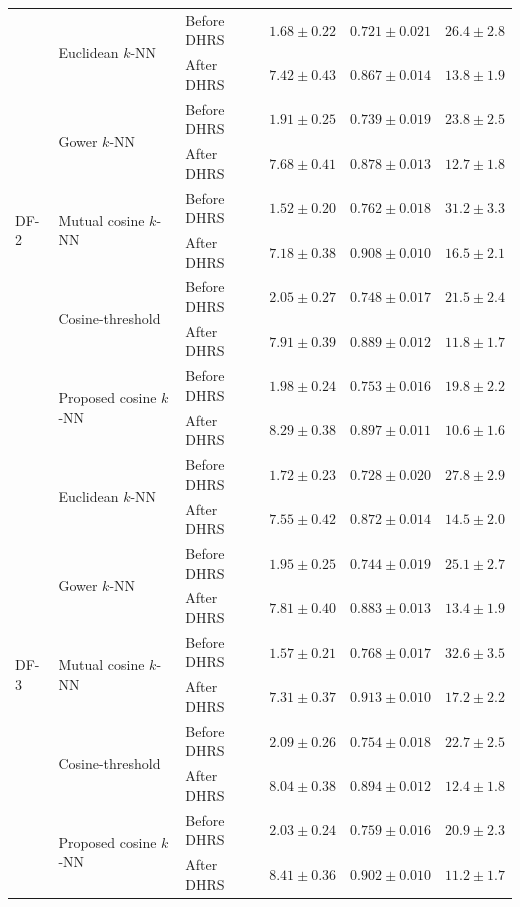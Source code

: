 \documentclass[pdflatex,sn-mathphys-num]{sn-jnl}%
\theoremstyle{thmstyleone}%
\theoremstyle{thmstyletwo}%
\theoremstyle{thmstylethree}%
\begin{document}
\begin{table}[!ht]
{\begin{tabular}{@{}lllccc@{}}
\multirow{10}{*}{DF-2}
& \multirow{2}{*}{Euclidean \(k\)-NN}
& Before DHRS & $1.68\pm0.22$ & $0.721\pm0.021$ & $26.4\pm2.8$ \\
&& After DHRS & $7.42\pm0.43$ & $0.867\pm0.014$ & $13.8\pm1.9$ \\
& \multirow{2}{*}{Gower \(k\)-NN}
& Before DHRS & $1.91\pm0.25$ & $0.739\pm0.019$ & $23.8\pm2.5$ \\
&& After DHRS & $7.68\pm0.41$ & $0.878\pm0.013$ & $12.7\pm1.8$ \\
& \multirow{2}{*}{Mutual cosine \(k\)-NN}
& Before DHRS & $1.52\pm0.20$ & $0.762\pm0.018$ & $31.2\pm3.3$ \\
&& After DHRS & $7.18\pm0.38$ & $0.908\pm0.010$ & $16.5\pm2.1$ \\
& \multirow{2}{*}{Cosine-threshold}
& Before DHRS & $2.05\pm0.27$ & $0.748\pm0.017$ & $21.5\pm2.4$ \\
&& After DHRS & $7.91\pm0.39$ & $0.889\pm0.012$ & $11.8\pm1.7$ \\
& \multirow{2}{*}{Proposed cosine \(k\)-NN}
& Before DHRS & $1.98\pm0.24$ & $0.753\pm0.016$ & $19.8\pm2.2$ \\
&& After DHRS & $8.29\pm0.38$ & $0.897\pm0.011$ & $10.6\pm1.6$ \\
\midrule

\multirow{10}{*}{DF-3}
& \multirow{2}{*}{Euclidean \(k\)-NN}
& Before DHRS & $1.72\pm0.23$ & $0.728\pm0.020$ & $27.8\pm2.9$ \\
&& After DHRS & $7.55\pm0.42$ & $0.872\pm0.014$ & $14.5\pm2.0$ \\
& \multirow{2}{*}{Gower \(k\)-NN}
& Before DHRS & $1.95\pm0.25$ & $0.744\pm0.019$ & $25.1\pm2.7$ \\
&& After DHRS & $7.81\pm0.40$ & $0.883\pm0.013$ & $13.4\pm1.9$ \\
& \multirow{2}{*}{Mutual cosine \(k\)-NN}
& Before DHRS & $1.57\pm0.21$ & $0.768\pm0.017$ & $32.6\pm3.5$ \\
&& After DHRS & $7.31\pm0.37$ & $0.913\pm0.010$ & $17.2\pm2.2$ \\
& \multirow{2}{*}{Cosine-threshold}
& Before DHRS & $2.09\pm0.26$ & $0.754\pm0.018$ & $22.7\pm2.5$ \\
&& After DHRS & $8.04\pm0.38$ & $0.894\pm0.012$ & $12.4\pm1.8$ \\
& \multirow{2}{*}{Proposed cosine \(k\)-NN}
& Before DHRS & $2.03\pm0.24$ & $0.759\pm0.016$ & $20.9\pm2.3$ \\
&& After DHRS & $8.41\pm0.36$ & $0.902\pm0.010$ & $11.2\pm1.7$ \\
\bottomrule
\end{tabular}%
}


\end{table}
\end{document}
